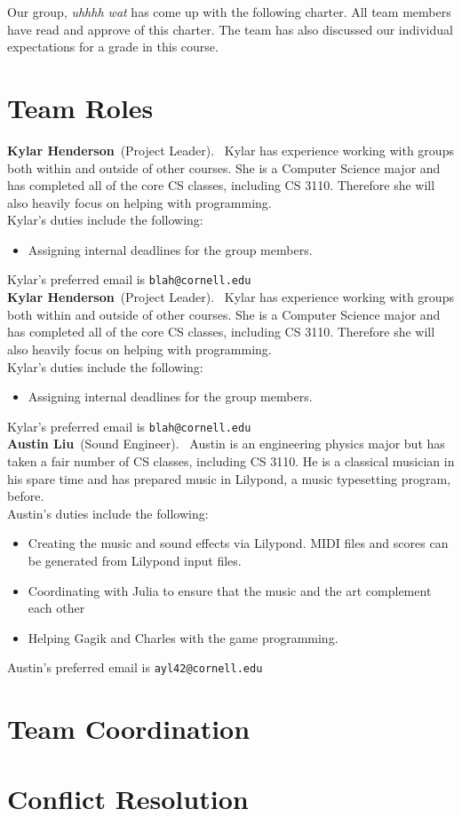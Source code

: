 \documentclass[letterpaper,11pt]{texMemo} %
\newcommand{\teamname}{uhhhh wat}
\newcommand{\teammember}[2]{ \textbf{#1}\ (#2).\ }
\newenvironment{duties}[1]
               {
                 #1's duties include the following:
                 \begin{itemize}
               }
               {
                 \end{itemize}
               }
\newcommand{\preferredemail}[2]{#1's preferred email is \texttt{#2}\\}
\begin{document}
\maketitle %


Our group, \textit{\teamname} has come up with the following charter.
All team members have read and approve of this charter. The team has also
discussed our individual expectations for a grade in this course.

\section*{Team Roles}

\teammember{Kylar Henderson}{Project Leader} Kylar has experience working
with groups both within and outside of other courses. She is a Computer Science
major and has completed all of the core CS classes, including CS 3110.
Therefore she will also heavily focus on helping with programming. \\
\begin{duties}{Kylar}
  \item Assigning internal deadlines for the group members.
\end{duties}
\preferredemail{Kylar}{blah@cornell.edu}

\teammember{Kylar Henderson}{Project Leader} Kylar has experience working
with groups both within and outside of other courses. She is a Computer Science
major and has completed all of the core CS classes, including CS 3110.
Therefore she will also heavily focus on helping with programming. \\
\begin{duties}{Kylar}
  \item Assigning internal deadlines for the group members.
\end{duties}
\preferredemail{Kylar}{blah@cornell.edu}

\teammember{Austin Liu}{Sound Engineer} Austin is an engineering physics major
but has taken a fair number of CS classes, including CS 3110. He is a classical
musician in his spare time and has prepared music in Lilypond, a music
typesetting program, before. \\
\begin{duties}{Austin}
\item Creating the music and sound effects via Lilypond.
  MIDI files and scores can be generated from Lilypond input files.
\item Coordinating with Julia to ensure that the music and the art complement
  each other
\item Helping Gagik and Charles with the game programming.
\end{duties}
\preferredemail{Austin}{ayl42@cornell.edu}


\section*{Team Coordination}

\section*{Conflict Resolution}

\end{document}

